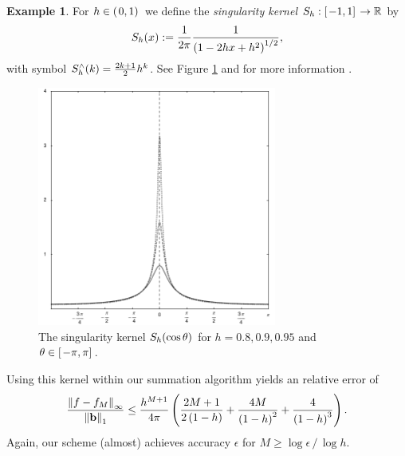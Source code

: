 \documentclass[11pt,a4paper,twoside,bibtotoc]{scrartcl}
\theoremstyle{plain}
\theoremstyle{definition}
\newtheorem{example}[theorem]{Example}
\theoremstyle{remark}
\numberwithin{equation}{section}
\numberwithin{table}{section}
\numberwithin{figure}{section}
\begin{document}

\begin{example}
  For $h \in \left(\left.0,1\right)\right.$ we define the \emph{singularity kernel}
  $S_{h}:\left[\left.-1,1\right]\right. \rightarrow \mathbb{R}$ by
  \[
    S_{h}{\hspace{-0.4ex}}\left(x\right) := \frac{1}{2\pi} \frac{1}{\left(1-2hx+h^2\right)^{1/2}},
  \]
  with symbol $S_{h}^{\wedge}{\hspace{-0.4ex}}\left(k\right) = \frac{2k+1}{2} h^k$.
  See Figure \ref{Basics:Figure:SingularityKernel} and for more information
  \cite[pp. 112]{frgesc}.
  \begin{figure}[tbp]
    \centering
    \includegraphics[width=0.7\textwidth]{images/singularity}
    \caption{The singularity kernel $S_{h}{\hspace{-0.4ex}}\left(\cos\theta\right)$ for $h =
    0.8,0.9,0.95$ and $\theta \in \left[\left.-\pi,\pi\right]\right.$.}
    \label{Basics:Figure:SingularityKernel}
  \end{figure}

  Using this kernel within our summation algorithm yields an relative error of
  \begin{equation}
    \label{error:singular}
    \frac{\left\|f - f_{M}\right\|_{\infty}}{\left\|\mathbf{b}\right\|_1} \le
    \frac{h^{M+1}}{4\pi} \left(\frac{2M+1}{2\left(1-h\right)}+
      \frac{4M}{\left(1-h\right)^2}+ \frac{4}{\left(1-h\right)^3}\right).
  \end{equation}
  Again, our scheme (almost) achieves accuracy $\epsilon$ for $M \ge
  \log\epsilon \, / \, \log h$.
\end{example}
\end{document}
